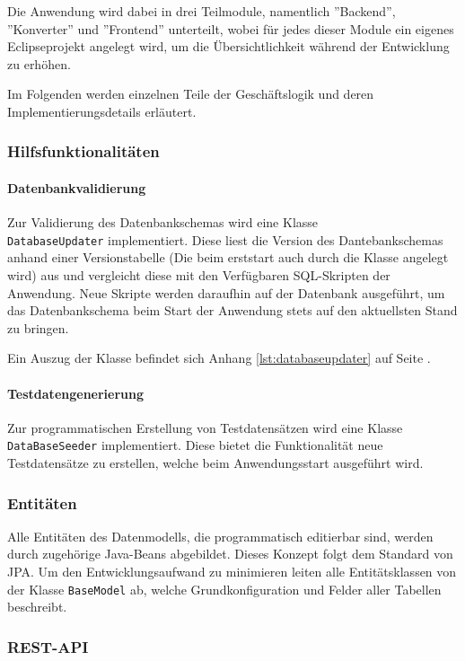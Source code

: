 \documentclass[12pt, xcolor=dvipsnames]{scrartcl}
\begin{document}
Die Anwendung wird dabei in drei Teilmodule, namentlich ''Backend'', ''Konverter'' und ''Frontend'' unterteilt, wobei für jedes dieser Module ein eigenes Eclipseprojekt angelegt wird, um die Übersichtlichkeit während der Entwicklung zu erhöhen.

Im Folgenden werden einzelnen Teile der Geschäftslogik und deren Implementierungsdetails erläutert.

\subsubsection*{Hilfsfunktionalitäten}

\paragraph*{Datenbankvalidierung}
Zur Validierung des Datenbankschemas wird eine Klasse \\\texttt{DatabaseUpdater} implementiert. Diese liest die Version des Dantebankschemas anhand einer Versionstabelle (Die beim erststart auch durch die Klasse angelegt wird) aus und vergleicht diese mit den Verfügbaren SQL-Skripten der Anwendung. Neue Skripte werden daraufhin auf der Datenbank ausgeführt, um das Datenbankschema beim Start der Anwendung stets auf den aktuellsten Stand zu bringen.

Ein Auszug der Klasse befindet sich Anhang \ref{lst:databaseupdater} auf Seite \pageref{lst:databaseupdater}.

\paragraph*{Testdatengenerierung}
Zur programmatischen Erstellung von Testdatensätzen wird eine Klasse \texttt{DataBaseSeeder} implementiert. Diese bietet die Funktionalität neue Testdatensätze zu erstellen, welche beim Anwendungsstart ausgeführt wird.

\subsubsection*{Entitäten}

Alle Entitäten des Datenmodells, die programmatisch editierbar sind, werden durch zugehörige Java-Beans abgebildet. Dieses Konzept folgt dem Standard von JPA. Um den Entwicklungsaufwand zu minimieren leiten alle Entitätsklassen von der Klasse \texttt{BaseModel} ab, welche Grundkonfiguration und Felder aller Tabellen beschreibt.

\subsubsection*{REST-API}
\end{document}
